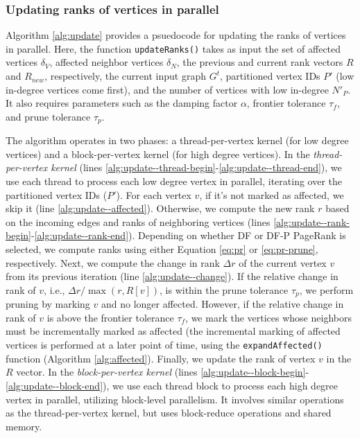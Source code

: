 \subsubsection{Updating ranks of vertices in parallel}

Algorithm \ref{alg:update} provides a psuedocode for updating the ranks of vertices in parallel. Here, the function \texttt{updateRanks()} takes as input the set of affected vertices $\delta_V$, affected neighbor vertices $\delta_N$, the previous and current rank vectors $R$ and $R_{new}$, respectively, the current input graph $G^t$, partitioned vertex IDs $P'$ (low in-degree vertices come first), and the number of vertices with low in-degree $N'_P$. It also requires parameters such as the damping factor $\alpha$, frontier tolerance $\tau_f$, and prune tolerance $\tau_p$.

The algorithm operates in two phases: a thread-per-vertex kernel (for low degree vertices) and a block-per-vertex kernel (for high degree vertices). In the \textit{thread-per-vertex kernel} (lines \ref{alg:update--thread-begin}-\ref{alg:update--thread-end}), we use each thread to process each low degree vertex in parallel, iterating over the partitioned vertex IDs ($P'$). For each vertex $v$, if it's not marked as affected, we skip it (line \ref{alg:update--affected}). Otherwise, we compute the new rank $r$ based on the incoming edges and ranks of neighboring vertices (lines \ref{alg:update--rank-begin}-\ref{alg:update--rank-end}). Depending on whether DF or DF-P PageRank is selected, we compute ranks using either Equation \ref{eq:pr} or \ref{eq:pr-prune}, respectively. Next, we compute the change in rank $\Delta r$ of the current vertex $v$ from its previous iteration (line \ref{alg:update--change}). If the relative change in rank of $v$, i.e., $\Delta r / \max(r, R[v])$, is within the prune tolerance $\tau_p$, we perform pruning by marking $v$ and no longer affected. However, if the relative change in rank of $v$ is above the frontier tolerance $\tau_f$, we mark the vertices whose neighbors must be incrementally marked as affected (the incremental marking of affected vertices is performed at a later point of time, using the \texttt{expandAffected()} function (Algorithm \ref{alg:affected}). Finally, we update the rank of vertex $v$ in the $R$ vector. In the \textit{block-per-vertex kernel} (lines \ref{alg:update--block-begin}-\ref{alg:update--block-end}), we use each thread block to process each high degree vertex in parallel, utilizing block-level parallelism. It involves similar operations as the thread-per-vertex kernel, but uses block-reduce operations and shared memory.


